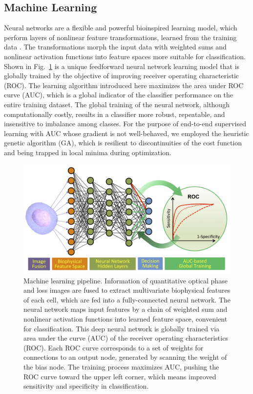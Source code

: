 \documentclass[aps,pra,reprint,longbibliography,superscriptaddress]{revtex4-1}
\begin{document}
\subsection{Machine Learning}

Neural networks are a flexible and powerful bioinspired learning model, which perform layers of nonlinear feature transformations, learned from the training data \cite{abu2012learning, bishop2006pattern, boddy1994neural}. The transformations morph the input data with weighted sums and nonlinear activation functions into feature spaces more suitable for classification. Shown in Fig.~\ref{fig:NeuralNet} is a unique feedforward neural network learning model that is globally trained by the objective of improving receiver operating characteristic (ROC). The learning algorithm introduced here maximizes the area under ROC curve (AUC), which is a global indicator of the classifier performance on the entire training dataset. The global training of the neural network, although computationally costly, results in a classifier more robust, repeatable, and insensitive to imbalance among classes. For the purpose of end-to-end supervised learning with AUC whose gradient is not well-behaved, we employed the heuristic genetic algorithm (GA), which is resilient to discontinuities of the cost function and being trapped in local minima during optimization.

\begin{figure}
\includegraphics[scale=0.08]{FigureNeuralNet.jpg}
\caption{\label{fig:NeuralNet} Machine learning pipeline. Information of quantitative optical phase and loss images are fused to extract multivariate biophysical features of each cell, which are fed into a fully-connected neural network. The neural network maps input features by a chain of weighted sum and nonlinear activation functions into learned feature space, convenient for classification. This deep neural network is globally trained via area under the curve (AUC) of the receiver operating characteristics (ROC). Each ROC curve corresponds to a set of weights for connections to an output node, generated by scanning the weight of the bias node. The training process maximizes AUC, pushing the ROC curve toward the upper left corner, which means improved sensitivity and specificity in classification.}
\end{figure}
\end{document}
